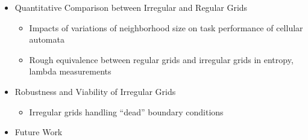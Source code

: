 \documentclass[a4paper, 11pt]{article}
\begin{document}
\begin{itemize}

\item Quantitative Comparison between Irregular and Regular Grids
\begin{itemize}
\item Impacts of variations of neighborhood size on task performance of cellular automata

\item Rough equivalence between regular grids and irregular grids in entropy, lambda measurements
\end{itemize}

\item Robustness and Viability of Irregular Grids
\begin{itemize}
\item Irregular grids handling ``dead'' boundary conditions
\end{itemize}

\item Future Work

\end{itemize}



\end{document}
